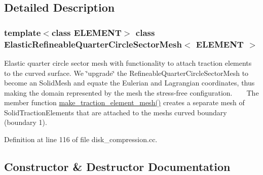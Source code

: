 \subsection{Detailed Description}
\subsubsection*{template$<$class E\+L\+E\+M\+E\+NT$>$\newline
class Elastic\+Refineable\+Quarter\+Circle\+Sector\+Mesh$<$ E\+L\+E\+M\+E\+N\+T $>$}

Elastic quarter circle sector mesh with functionality to attach traction elements to the curved surface. We \char`\"{}upgrade\char`\"{} the Refineable\+Quarter\+Circle\+Sector\+Mesh to become an Solid\+Mesh and equate the Eulerian and Lagrangian coordinates, thus making the domain represented by the mesh the stress-\/free configuration. ~\newline
~\newline
The member function {\ttfamily \hyperlink{classElasticRefineableQuarterCircleSectorMesh_ad9734ea7aee2141079544bb782d3ace1}{make\+\_\+traction\+\_\+element\+\_\+mesh()}} creates a separate mesh of Solid\+Traction\+Elements that are attached to the mesh\textquotesingle{}s curved boundary (boundary 1). 

Definition at line 116 of file disk\+\_\+compression.\+cc.



\subsection{Constructor \& Destructor Documentation}
\mbox{\label{classElasticRefineableQuarterCircleSectorMesh_a123699deecd2a908a7a882a9d2a9f4dd}} 

